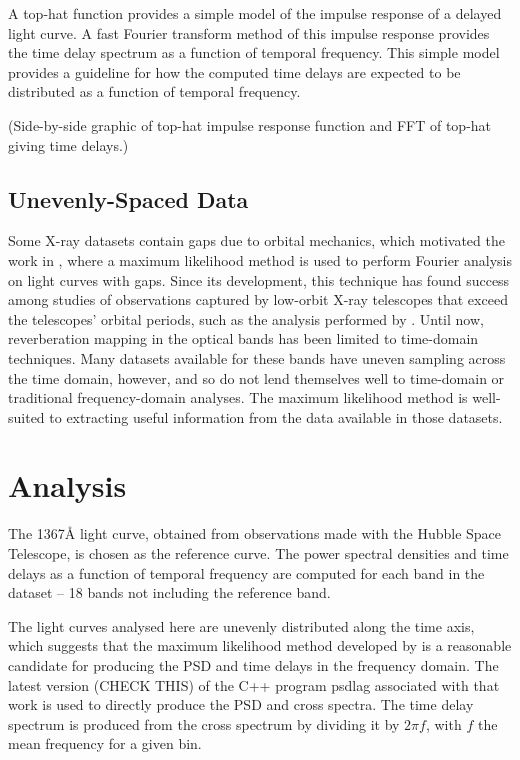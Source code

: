 \documentclass[11pt,letterpaper,fleqn]{article}
\begin{document}
	A top-hat function provides a simple model of the impulse response of a
	delayed light curve. A fast Fourier transform method of this impulse
	response provides the time delay spectrum as a function of temporal
	frequency. This simple model provides a guideline for how the computed
	time delays are expected to be distributed as a function of temporal
	frequency.


	(Side-by-side graphic of top-hat impulse response function and FFT of
	top-hat giving time delays.)

	\subsection{Unevenly-Spaced Data}
 	
 	Some X-ray datasets contain gaps due to orbital mechanics, which motivated
	the work in \citet{2013ApJ...777...24Z}, where a maximum likelihood method
	is used to perform Fourier analysis on light curves with gaps. Since its
	development, this technique has found success among studies of
	observations captured by low-orbit X-ray telescopes that exceed the
	telescopes' orbital periods, such as the analysis performed by
	\citet{2016arXiv160606736K}. Until now, reverberation mapping in the
	optical bands has been limited to time-domain techniques. Many datasets
	available for these bands have uneven sampling across the time domain,
	however, and so do not lend themselves well to time-domain or traditional
	frequency-domain analyses. The maximum likelihood method is well-suited
	to extracting useful information from the data available in those
	datasets.



\section{Analysis}
The 1367\AA$ $ light curve, obtained from observations made with the Hubble
Space Telescope, is chosen as the reference curve. The power spectral
densities and time delays as a function of temporal frequency are computed for
each band in the dataset -- 18 bands not including the reference band.

The light curves analysed here are unevenly distributed along the time axis,
which suggests that the maximum likelihood method developed by
\citet{2013ApJ...777...24Z} is a reasonable candidate for producing the PSD and
time delays in the frequency domain. The latest version (CHECK THIS) of the
C++ program psdlag associated with that work is used to directly produce the
PSD and cross spectra. The time delay spectrum is produced from the cross
spectrum by dividing it by $2 \pi f$, with $f$ the mean frequency for a given
bin.
\end{document}
